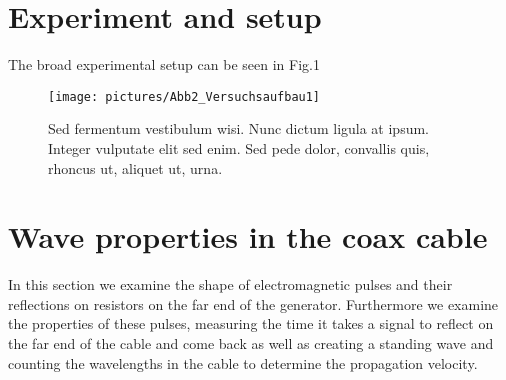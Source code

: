 \documentclass[a4paper,10pt,twocolumn]{article}
\begin{document}
    \section{Experiment and setup}
    The broad experimental setup can be seen in Fig.1 
    \begin{figure}[htbp]                                 %
        \begin{center}                                       %
            \texttt{[image: pictures/Abb2\_Versuchsaufbau1]}      %
            \caption[]{Sed fermentum vestibulum wisi. Nunc dictum ligula at ipsum. Integer vulputate elit sed enim. Sed pede dolor, convallis quis, rhoncus ut, aliquet ut, urna.}   %
            \label{fig:Aufbau}                                      %
        \end{center}
    \end{figure}
    \section{Wave properties in the coax cable}
    In this section we examine the shape of electromagnetic pulses and their reflections on resistors on the far end of the generator.
    Furthermore we examine the properties of these pulses, measuring the time it takes a signal to reflect on the far end of the cable and come back as well as creating a standing wave and counting the wavelengths in the cable to determine the propagation velocity.
    
\end{document}
